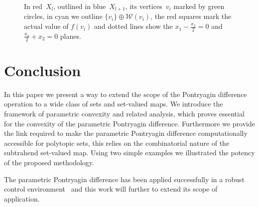 \documentclass[smallextended]{svjour3}       %
\numberwithin{equation}{section}
\begin{document}
\begin{figure}
\caption{In red~$X_l$, outlined in blue~$X_{l+1}$, its vertices~$v_i$ marked by green circles, in cyan we outline $\{v_i\}\oplus\mathcal W(v_i)$, the red squares mark the actual value of $f(v_i)$ and dotted lines show the $x_1-\frac{x_2}{2}=0$ and $\frac{x_1}{2}+x_2=0$ planes.}
\label{fig:second:example:resulting:set}
\end{figure}
%
%
%
%
%
\section{Conclusion}\label{sec:conclusion}
%
%
%
In this paper we present a way to extend the scope of the Pontryagin
difference operation to a wide class of sets and set-valued maps.
%
We introduce the framework of parametric convexity and related analysis, which proves essential for the convexity of the parametric Pontryagin difference.
%
Furthermore we provide the link required to make the parametric Pontryagin difference computationally accessible for polytopic sets, this relies on the combinatorial nature of the subtrahend set-valued map.
%
Using two simple examples we illustrated the potency of the proposed methodology.

The parametric Pontryagin difference has been applied successfully in a robust control environment~\cite{Schaich:2015,Schaich:2015a} and this work will further to extend its scope of application.



\end{document}
